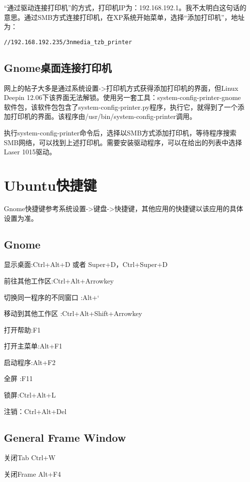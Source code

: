 “通过驱动连接打印机”的方式，打印机IP为：192.168.192.1。我不太明白这句话的意思。通过SMB方式连接打印机，在XP系统开始菜单，选择“添加打印机”，地址为：
\begin{verbatim}
//192.168.192.235/3nmedia_tzb_printer
\end{verbatim}

\subsection{Gnome桌面连接打印机}
网上的帖子大多是通过系统设置->打印机方式获得添加打印机的界面，但Linux Deepin 12.06下该界面无法解锁。使用另一套工具：system-config-printer-gnome软件包，该软件包包含了system-config-printer.py程序，执行它，就得到了一个添加打印机的界面。该程序由/usr/bin/system-config-printer调用。

执行system-config-printer命令后，选择以SMB方式添加打印机，等待程序搜索SMB网络，可以找到上述打印机。需要安装驱动程序，可以在给出的列表中选择Laser 1015驱动。



\section{Ubuntu快捷键}

Gnome快捷键参考系统设置->键盘->快捷键，其他应用的快捷键以该应用的具体设置为准。

\subsection{Gnome}

显示桌面:Ctrl+Alt+D 或者 Super+D，Ctrl+Super+D

前往其他工作区:Ctrl+Alt+Arrowkey

切换同一程序的不同窗口 :Alt+`

移动到其他工作区 :Ctrl+Alt+Shift+Arrowkey

打开帮助:F1

打开主菜单:Alt+F1

启动程序:Alt+F2

全屏 :F11

锁屏:Ctrl+Alt+L

注销：Ctrl+Alt+Del

\subsection{General Frame Window}

关闭Tab Ctrl+W

关闭Frame Alt+F4


